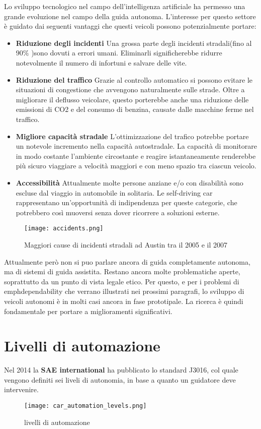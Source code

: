 Lo sviluppo tecnologico nel campo dell'intelligenza artificiale ha permesso una grande evoluzione nel campo della guida autonoma. L'interesse per questo 
settore è guidato dai seguenti vantaggi che questi veicoli possono potenzialmente portare\cite{advantages}:
\begin{itemize}
    \item \textbf{Riduzione degli incidenti} Una grossa parte degli incidenti stradali(fino al $90\%$ )sono dovuti a errori umani. Eliminarli
    significherebbe ridurre notevolmente il numero di infortuni e salvare delle vite.
    \item \textbf{Riduzione del traffico} Grazie al controllo automatico si possono evitare le situazioni di congestione che avvengono naturalmente sulle strade.
    Oltre a migliorare il deflusso veicolare, questo porterebbe anche  una riduzione delle emissioni di CO2 e del consumo di benzina, causate dalle macchine ferme nel traffico.
    \item \textbf{Migliore capacità stradale} L'ottimizzazione del trafico potrebbe portare un notevole incremento nella capacità autostradale. La capacità
    di monitorare in modo costante l'ambiente circostante e reagire istantaneamente renderebbe più sicuro viaggiare a velocità maggiori e con meno spazio tra ciascun veicolo.
    \item \textbf{Accessibilità} Attualmente  molte persone anziane  e/o con disabilità sono escluse dal viaggio in automobile in solitaria. Le self-driving car rappresentano un'opportunità
    di indipendenza per queste categorie, che potrebbero così muoversi senza dover ricorrere a soluzioni esterne.
\end{itemize}
\begin{figure}
    \texttt{[image: accidents.png]}
    \caption{Maggiori cause di incidenti stradali ad Austin tra il 2005 e il 2007\cite{accid}}
    \label{fig:accid}
\end{figure}
Attualmente però non si puo parlare ancora di guida completamente autonoma, ma di sistemi di guida assistita. Restano ancora molte problematiche aperte, soprattutto 
da un punto di vista legale\cite{legal} etico\cite{Lin2015}. Per questo, e per i problemi di emph{dependability} che verrano illustrati nei prossimi paragrafi, lo sviluppo
di veicoli autonomi è in molti casi ancora in fase prototipale. La ricerca è quindi fondamentale per portare a miglioramenti significativi.
\section{Livelli di automazione}
Nel 2014 la \textbf{SAE international} ha pubblicato lo standard J3016, col quale vengono definiti sei liveli di autonomia, in base a quanto un guidatore deve intervenire.
\begin{figure}
    \texttt{[image: car\_automation\_levels.png]}
    \caption{livelli di automazione\cite{car}}
    \label{fig:adaslevel}
\end{figure}
